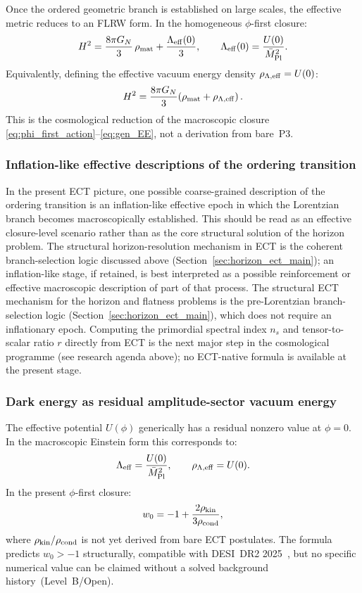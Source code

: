 \documentclass[11pt,a4paper]{article}
\numberwithin{equation}{section}
\begin{document}
Once the ordered geometric branch is established on large scales, the
effective metric reduces to an FLRW form.
In the homogeneous $\phi$-first closure:
\begin{equation}
  \label{eq:FLRW}
  H^2
  = \frac{8\pi G_N}{3}\,\rho_{\rm mat}
  + \frac{\Lambda_{\rm eff}(0)}{3},
  \qquad
  \Lambda_{\rm eff}(0)=\frac{U(0)}{\bar M_{\rm Pl}^2}.
\end{equation}
Equivalently, defining the effective vacuum energy density
$\rho_{\Lambda,{\rm eff}}=U(0)$:
\[
H^2=\frac{8\pi G_N}{3}\!\left(\rho_{\rm mat}+\rho_{\Lambda,{\rm eff}}\right).
\]
This is the cosmological reduction of the macroscopic closure
\eqref{eq:phi_first_action}--\eqref{eq:gen_EE}, not a derivation from
bare~P3.

\subsubsection*{Inflation-like effective descriptions of the ordering transition}

In the present ECT picture, one possible coarse-grained description of
the ordering transition is an inflation-like effective epoch in which
the Lorentzian branch becomes macroscopically established.
This should be read as an effective closure-level scenario rather than
as the core structural solution of the horizon problem.
The structural horizon-resolution mechanism in ECT is the coherent
branch-selection logic discussed above
(Section~\ref{sec:horizon_ect_main}); an inflation-like stage, if
retained, is best interpreted as a possible reinforcement or effective
macroscopic description of part of that process.
The structural ECT mechanism for the horizon and flatness problems is
the pre-Lorentzian branch-selection logic
(Section~\ref{sec:horizon_ect_main}), which does not require an
inflationary epoch.
Computing the primordial spectral index $n_s$ and tensor-to-scalar
ratio $r$ directly from ECT is the next major step in the
cosmological programme (see research agenda above); no ECT-native
formula is available at the present stage.

\subsubsection*{Dark energy as residual amplitude-sector vacuum energy}

The effective potential $U(\phi)$ generically has a residual nonzero
value at $\phi=0$.
In the macroscopic Einstein form this corresponds to:
\begin{equation}
  \label{eq:dark_energy}
  \Lambda_{\rm eff}=\frac{U(0)}{\bar M_{\rm Pl}^2},
  \qquad
  \rho_{\Lambda,{\rm eff}}=U(0).
\end{equation}
In the present $\phi$-first closure:
\begin{equation}
  \label{eq:w0_fit}
  w_0 = -1 + \frac{2\rho_{\rm kin}}{3\rho_{\rm cond}},
\end{equation}
where $\rho_{\rm kin}/\rho_{\rm cond}$ is not yet derived
from bare ECT postulates. The formula predicts $w_0>-1$
structurally, compatible with DESI~DR2 2025~\cite{DESI2024},
but no specific numerical value can be claimed without
a solved background history~(Level~B/Open).
\end{document}

